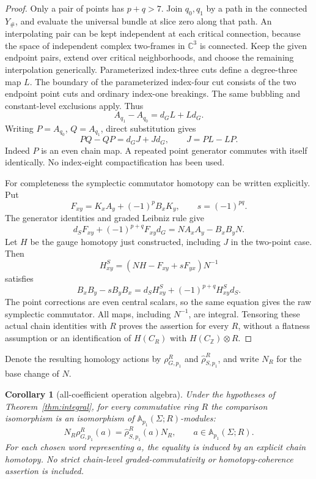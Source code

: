 \documentclass[11pt]{amsart}
\newtheorem{corollary}[theorem]{Corollary}
\theoremstyle{definition}
\theoremstyle{remark}
\theoremstyle{plain}
\newcommand{\ZZ}{\mathbb{Z}}
\newcommand{\CC}{\mathbb{C}}
\begin{document}
\begin{proof}
Only a pair of points has $p+q>7$. Join $q_0,q_1$
by a path in the connected $Y_\#$, and evaluate
the universal bundle at slice zero along that
path. An interpolating pair can be kept independent
at each critical connection, because the space
of independent complex two-frames in $\CC^3$
is connected. Keep the given endpoint pairs,
extend over critical neighborhoods, and choose
the remaining interpolation generically.
Parameterized index-three cuts define a
degree-three map $L$. The boundary of the
parameterized index-four cut consists of
the two endpoint point cuts and ordinary
index-one breakings. The same bubbling and
constant-level exclusions apply. Thus
\begin{equation}\label{eq:ordinary-point-path-homotopy}
                    A_{q_1}-A_{q_0}=d_GL+Ld_G.
\end{equation}
Writing $P=A_{q_0}$, $Q=A_{q_1}$, direct
substitution gives
\begin{equation}\label{eq:ordinary-point-pair-commutator}
 PQ-QP=d_GJ+Jd_G,\qquad J=PL-LP.
\end{equation}
Indeed $P$ is an even chain map. A repeated
point generator commutes with itself identically.
No index-eight compactification has been used.

For completeness the symplectic commutator
homotopy can be written explicitly. Put
\[
 F_{xy}=K_xA_y+(-1)^pB_xK_y,\qquad s=(-1)^{pq}.
\]
The generator identities and graded Leibniz rule give
\[
 d_SF_{xy}+(-1)^{p+q}F_{xy}d_G
                          =NA_xA_y-B_xB_yN.
\]
Let $H$ be the gauge homotopy just constructed,
including $J$ in the two-point case. Then
\begin{equation}\label{eq:transferred-integral-commutator}
 H^S_{xy}=(NH-F_{xy}+sF_{yx})N^{-1}
\end{equation}
satisfies
\[
 B_xB_y-sB_yB_x
       =d_SH^S_{xy}+(-1)^{p+q}H^S_{xy}d_S.
\]
The point corrections are even central scalars,
so the same equation gives the raw symplectic
commutator. All maps, including $N^{-1}$,
are integral. Tensoring these actual chain
identities with $R$ proves the assertion for
every $R$, without a flatness assumption or
an identification of $H(C_R)$ with $H(C_{\ZZ})\otimes R$.
\end{proof}

Denote the resulting homology actions by
$\rho_{G,p_1}^R$ and $\widehat\rho_{S,p_1}^R$,
and write $N_R$ for the base change of $N$.

\begin{corollary}[all-coefficient operation algebra]
\label{thm:full-operation-algebra}
Under the hypotheses of Theorem~\ref{thm:integral},
for every commutative ring $R$ the comparison
isomorphism is an isomorphism of
$\mathbb A_{p_1}(\Sigma;R)$-modules:
\begin{equation}\label{eq:full-integral-action}
 N_R\rho_{G,p_1}^R(a)
   =\widehat\rho_{S,p_1}^R(a)N_R,
 \qquad a\in\mathbb A_{p_1}(\Sigma;R).
\end{equation}
For each chosen word representing $a$, the equality
is induced by an explicit chain homotopy.
No strict chain-level graded-commutativity or
homotopy-coherence assertion is included.
\end{corollary}
\end{document}
